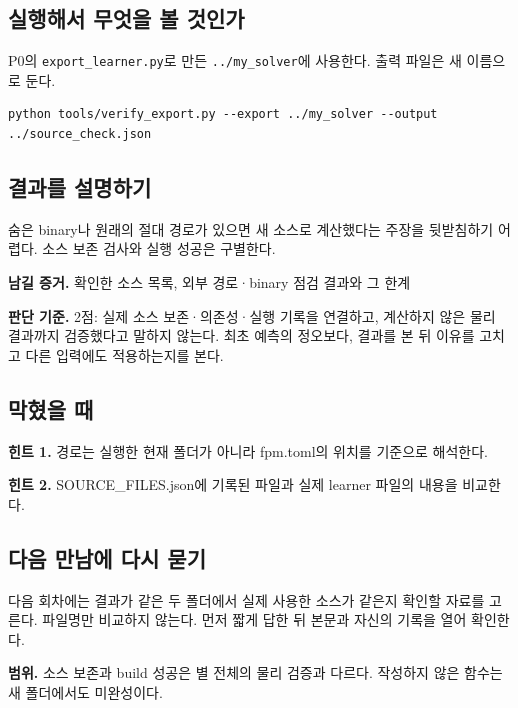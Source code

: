 \documentclass[
  10pt,
  a4paper,
]{article}
\begin{document}
\newpage

\subsection{실행해서 무엇을 볼
것인가}\label{uxc2e4uxd589uxd574uxc11c-uxbb34uxc5c7uxc744-uxbcfc-uxac83uxc778uxac00}

P0의 \texttt{export\_learner.py}로 만든 \texttt{../my\_solver}에
사용한다. 출력 파일은 새 이름으로 둔다.

\begin{verbatim}
python tools/verify_export.py --export ../my_solver --output ../source_check.json
\end{verbatim}

\subsection{결과를
설명하기}\label{uxacb0uxacfcuxb97c-uxc124uxba85uxd558uxae30}

숨은 binary나 원래의 절대 경로가 있으면 새 소스로 계산했다는 주장을
뒷받침하기 어렵다. 소스 보존 검사와 실행 성공은 구별한다.

\textbf{남길 증거.} 확인한 소스 목록, 외부 경로·binary 점검 결과와 그
한계

\textbf{판단 기준.} 2점: 실제 소스 보존·의존성·실행 기록을 연결하고,
계산하지 않은 물리 결과까지 검증했다고 말하지 않는다. 최초 예측의
정오보다, 결과를 본 뒤 이유를 고치고 다른 입력에도 적용하는지를 본다.

\subsection{막혔을 때}\label{uxb9c9uxd614uxc744-uxb54c}

\textbf{힌트 1.} 경로는 실행한 현재 폴더가 아니라 fpm.toml의 위치를
기준으로 해석한다.

\textbf{힌트 2.} SOURCE\_FILES.json에 기록된 파일과 실제 learner 파일의
내용을 비교한다.

\subsection{다음 만남에 다시
묻기}\label{uxb2e4uxc74c-uxb9ccuxb0a8uxc5d0-uxb2e4uxc2dc-uxbb3buxae30}

다음 회차에는 결과가 같은 두 폴더에서 실제 사용한 소스가 같은지 확인할
자료를 고른다. 파일명만 비교하지 않는다. 먼저 짧게 답한 뒤 본문과 자신의
기록을 열어 확인한다.

\textbf{범위.} 소스 보존과 build 성공은 별 전체의 물리 검증과 다르다.
작성하지 않은 함수는 새 폴더에서도 미완성이다.
\end{document}
